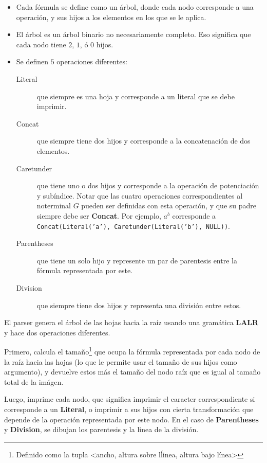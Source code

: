 \documentclass[a4paper, 10pt, twoside]{article}
\begin{document}
\begin{itemize}
\item Cada f\'ormula se define como un \'arbol, donde cada nodo corresponde a una operaci\'on, y sus hijos a los elementos en los que se le aplica.
\item El \'arbol es un \'arbol binario no necesariamente completo. Eso significa que cada nodo tiene \(2\), \(1\), \'o \(0\) hijos.
\item Se definen \(5\) operaciones diferentes:
	\begin{description}
		\item[Literal] que siempre es una hoja y corresponde a un literal que se debe imprimir.
		\item[Concat] que siempre tiene dos hijos y corresponde a la concatenaci\'on de dos elementos.
		\item[Caretunder] que tiene uno o dos hijos y corresponde a la operaci\'on de potenciaci\'on y sub\'indice. Notar que las cuatro operaciones correspondientes al noterminal \(G\) pueden ser definidas con esta operaci\'on, y que su padre siempre debe ser \textbf{Concat}. Por ejemplo, \(a^b\) corresponde a \texttt{Concat(Literal('a'), Caretunder(Literal('b'), NULL))}.
		\item[Parentheses] que tiene un solo hijo y represente un par de parentesis entre la f\'ormula representada por este.
		\item[Division] que siempre tiene dos hijos y representa una divisi\'on entre estos.
	\end{description}
\end{itemize}

El parser genera el \'arbol de las hojas hacia la ra\'iz usando una gram\'atica \textbf{LALR} y hace dos operaciones diferentes.

Primero, calcula el tama\~no\footnote{Definido como la tupla <ancho, altura sobre l\'linea, altura bajo l\'inea>} que ocupa la f\'ormula representada por cada nodo de la ra\'iz hacia las hojas (lo que le permite usar el tama\~no de sus hijos como argumento), y devuelve estos m\'as el tama\~no del nodo ra\'iz que es igual al tama\~no total de la im\'agen.

Luego, imprime cada nodo, que significa imprimir el caracter correspondiente si corresponde a un \textbf{Literal}, o imprimir a sus hijos con cierta transformaci\'on que depende de la operaci\'on representada por este nodo. En el caso de \textbf{Parentheses} y \textbf{Division}, se dibujan los parentesis y la linea de la divisi\'on.
\end{document}
